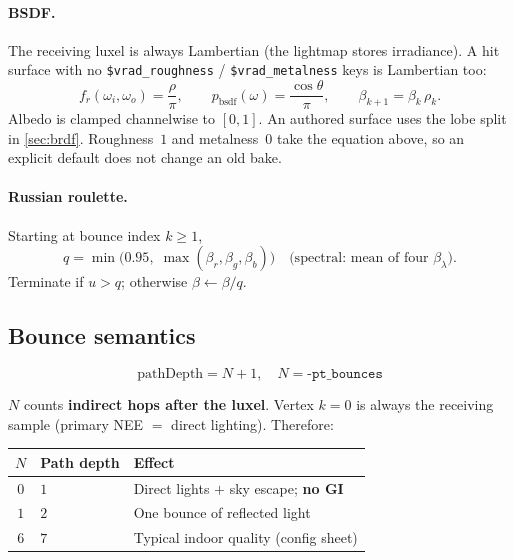 \documentclass[11pt,a4paper]{article}
\newcommand{\vmt}[1]{\texttt{\$#1}}
\begin{document}
\paragraph{BSDF.}
The receiving luxel is always Lambertian (the lightmap stores irradiance).
A hit surface with no \vmt{vrad\_roughness} / \vmt{vrad\_metalness} keys is Lambertian too:
\begin{equation}
  f_r(\omega_i,\omega_o)=\frac{\rho}{\pi},
  \qquad
  p_{\mathrm{bsdf}}(\omega)=\frac{\cos\theta}{\pi},
  \qquad
  \beta_{k+1} = \beta_k\,\rho_k.
\end{equation}
Albedo is clamped channelwise to $[0,1]$. An authored surface uses the lobe split in
\cref{sec:brdf}. Roughness~$1$ and metalness~$0$ take the equation above, so an
explicit default does not change an old bake.

\paragraph{Russian roulette.}
Starting at bounce index $k\ge 1$,
\begin{equation}
  q = \min\!\bigl(0.95,\;\max(\beta_r,\beta_g,\beta_b)\bigr)
  \quad\text{(spectral: mean of four $\beta_\lambda$)}.
\end{equation}
Terminate if $u>q$; otherwise $\beta\leftarrow\beta/q$.

\subsection{Bounce semantics}
\label{sec:bounces}

\begin{eqbox}
\begin{equation*}
  \boxed{\;\text{pathDepth}=N+1,\quad N=\texttt{-pt\_bounces}\;}
\end{equation*}
\end{eqbox}

$N$ counts \textbf{indirect hops after the luxel}. Vertex $k=0$ is always the
receiving sample (primary NEE $=$ direct lighting). Therefore:

\begin{center}
\begin{tabular}{@{}cll@{}}
  \toprule
  $N$ & Path depth & Effect \\
  \midrule
  $0$ & $1$ & Direct lights $+$ sky escape; \textbf{no GI} \\
  $1$ & $2$ & One bounce of reflected light \\
  $6$ & $7$ & Typical indoor quality (config sheet) \\
  \bottomrule
\end{tabular}
\end{center}
\end{document}
